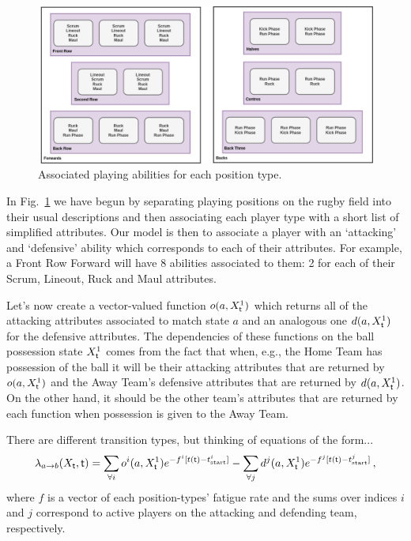 \begin{figure}[h]
\includegraphics[width=15cm]{images/rugby-player-abilities.drawio.png}
\caption{Associated playing abilities for each position type.}
\label{fig:player-abilities}
\end{figure}

In Fig.~\ref{fig:player-abilities} we have begun by separating playing positions on the rugby field into their usual descriptions and then associating each player type with a short list of simplified attributes. Our model is then to associate a player with an `attacking' and `defensive' ability which corresponds to each of their attributes. For example, a Front Row Forward will have 8 abilities associated to them: 2 for each of their {\sf Scrum}, {\sf Lineout}, {\sf Ruck} and {\sf Maul} attributes. 

Let's now create a vector-valued function $o (a, X^1_{\sf t})$ which returns all of the attacking attributes associated to match state $a$ and an analogous one $d (a, X^1_{\sf t})$ for the defensive attributes. The dependencies of these functions on the ball possession state $X^1_{\sf t}$ comes from the fact that when, e.g., the {\sf Home Team} has possession of the ball it will be their attacking attributes that are returned by $o (a, X^1_{\sf t})$ and the {\sf Away Team}'s defensive attributes that are returned by $d (a, X^1_{\sf t})$. On the other hand, it should be the other team's attributes that are returned by each function when possession is given to the {\sf Away Team}. 

There are different transition types, but thinking of equations of the form...
\begin{align}
\lambda_{a\rightarrow b}(X_{\sf t}, {\sf t}) = \sum_{\forall i} o^i(a, X^1_{\sf t})e^{-f^i[t({\sf t})-t^i_{\rm start}]} - \sum_{\forall j}d^j(a, X^1_{\sf t})e^{-f^j[t({\sf t})-t^j_{\rm start}]} \,,
\end{align}
where $f$ is a vector of each position-types' fatigue rate and the sums over indices $i$ and $j$ correspond to active players on the attacking and defending team, respectively.


